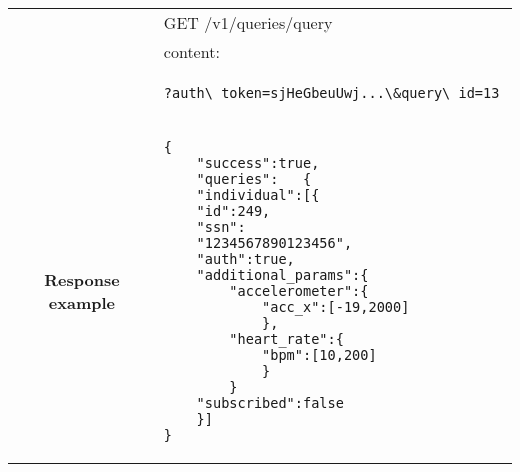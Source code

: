\begin{adjustwidth}{1cm}{}
\begin{longtable}{|c|l|}
             & GET /v1/queries/query \\
             & content: \\
            & \begin{minipage}[t]{0.5\textwidth}
                \begin{adjustwidth}{1.5cm}{}
                \begin{verbatim}
?auth\_token=sjHeGbeuUwj...\&query\_id=13 
                \end{verbatim}
                \end{adjustwidth}
              \end{minipage} \\
            \hline
             \textbf{Response example} & 
              \begin{minipage}[t]{0.5\textwidth}
                \begin{adjustwidth}{1.5cm}{}
                \begin{verbatim}
{
    "success":true,
    "queries":   {
    "individual":[{
    "id":249,
    "ssn":
    "1234567890123456",
    "auth":true,
    "additional_params":{
        "accelerometer":{
            "acc_x":[-19,2000]
            },
        "heart_rate":{
            "bpm":[10,200]
            }
        }
    "subscribed":false
    }]
}
                \end{verbatim}
                \end{adjustwidth}
              \end{minipage} \\
              \hline
 
        \end{longtable}
    \end{adjustwidth} 
    
